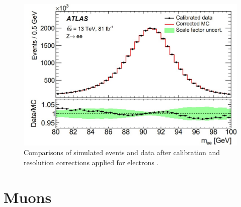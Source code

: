 \begin{figure}[h]
    \centering
    \includegraphics[scale=0.38]{figs/ch4/JES-ele.jpg}
    \caption{ Comparisons of simulated events and data after calibration and resolution corrections applied for electrons \cite{ele-reco}.}
\label{fig:4.2}
\end{figure}

\section{Muons}\label{sec:muon-reco}

